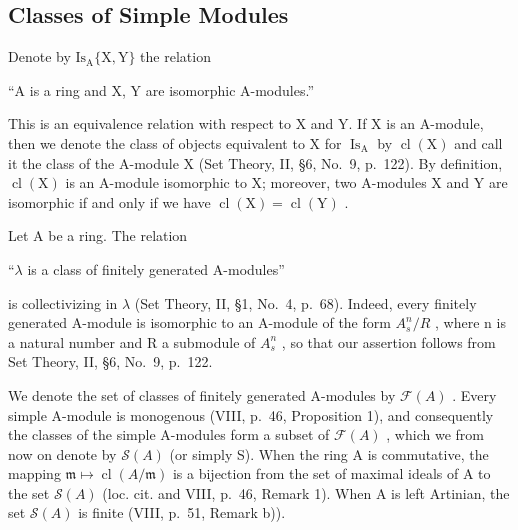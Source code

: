 \subsection{Classes of Simple Modules}

Denote by \(\mathrm{Is}_{\mathrm{A}}\{\mathrm{X},\mathrm{Y}\}\) the relation

``A is a ring and X, Y are isomorphic A-modules.''

This is an equivalence relation with respect to X and Y. If X is an A-module, then we denote the class of objects equivalent to X for \(\operatorname{Is}_{\mathrm{A}}\) by \(\operatorname{cl}(\mathrm{X})\) and call it the class of the A-module X (Set Theory, II, §6, No.~9, p.~122). By definition, \(\operatorname{cl}(\mathrm{X})\) is an A-module isomorphic to X; moreover, two A-modules X and Y are isomorphic if and only if we have \(\operatorname{cl}(\mathrm{X}) = \operatorname{cl}(\mathrm{Y})\) .

Let A be a ring. The relation

``\(\lambda\) is a class of finitely generated A-modules''

is collectivizing in \(\lambda\) (Set Theory, II, §1, No.~4, p.~68). Indeed, every finitely generated A-module is isomorphic to an A-module of the form \(A_{s}^{n}/R\) , where n is a natural number and R a submodule of \(A_{s}^{n}\) , so that our assertion follows from Set Theory, II, §6, No.~9, p.~122.

We denote the set of classes of finitely generated A-modules by \(\mathcal{F}(A)\) . Every simple A-module is monogenous (VIII, p.~46, Proposition 1), and consequently the classes of the simple A-modules form a subset of \(\mathcal{F}(A)\) , which we from now on denote by \(\mathcal{S}(A)\) (or simply S). When the ring A is commutative, the mapping \(\mathfrak{m} \mapsto \operatorname{cl}(A/\mathfrak{m})\) is a bijection from the set of maximal ideals of A to the set \(\mathcal{S}(A)\) (loc. cit. and VIII, p.~46, Remark 1). When A is left Artinian, the set \(\mathcal{S}(A)\) is finite (VIII, p.~51, Remark b)).

